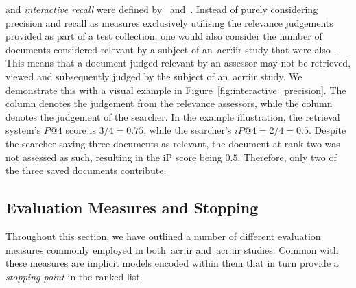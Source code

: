  and \emph{interactive recall} were defined by~\cite{veerasamy1996iir} and~\cite{veerasamy1997graphical_display}. Instead of purely considering precision and recall as measures exclusively utilising the relevance judgements provided as part of a test collection, one would also consider the number of documents considered relevant by a subject of an~\gls{acr:iir} study that were also . This means that a document judged relevant by an assessor may not be retrieved, viewed and subsequently judged by the subject of an~\gls{acr:iir} study. We demonstrate this with a visual example in Figure~\ref{fig:interactive_precision}. The  column denotes the judgement from the relevance assessors, while the  column denotes the judgement of the searcher. In the example illustration, the retrieval system's $P@4$ score is $3/4=0.75$, while the searcher's $iP@4 = 2/4 = 0.5$. Despite the searcher saving three documents as relevant, the document at rank two was not assessed as such, resulting in the iP score being $0.5$. Therefore, only two of the three saved documents contribute.

%
%

\subsection{Evaluation Measures and Stopping}
Throughout this section, we have outlined a number of different evaluation measures commonly employed in both~\gls{acr:ir} and~\gls{acr:iir} studies. Common with these measures are implicit models encoded within them that in turn provide a \emph{stopping point} in the ranked list.

